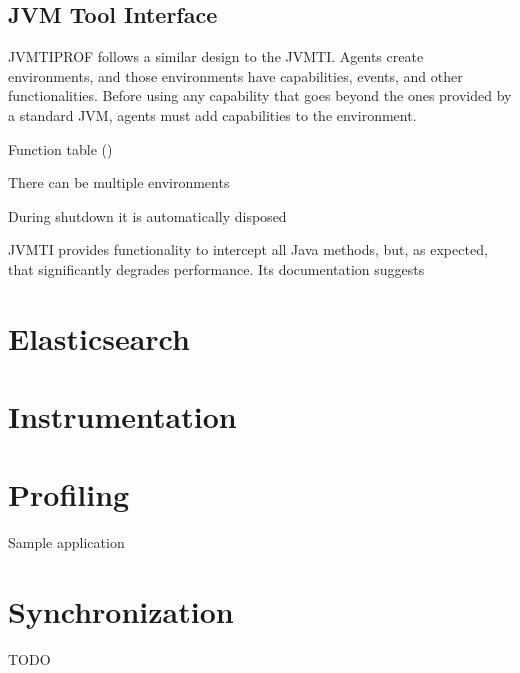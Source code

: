 \subsection{JVM Tool Interface}

JVMTIPROF follows a similar design to the JVMTI. Agents create environments, and those environments have capabilities, events, and other functionalities. Before using any capability that goes beyond the ones provided by a standard JVM, agents must add capabilities to the environment. %

Function table ()

There can be multiple environments

During shutdown it is automatically disposed

JVMTI provides functionality to intercept all Java methods, but, as expected, that significantly degrades performance. Its documentation suggests






\section{Elasticsearch}

\section{Instrumentation}



\section{Profiling}




Sample application



\section{Synchronization}


TODO





